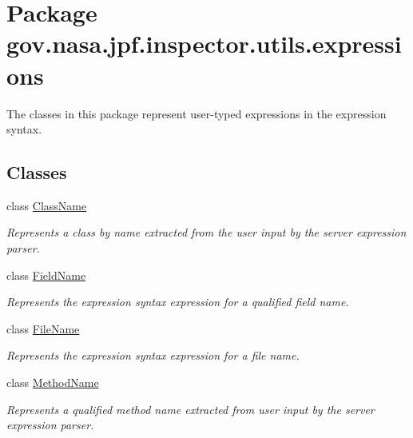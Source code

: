 \hypertarget{namespacegov_1_1nasa_1_1jpf_1_1inspector_1_1utils_1_1expressions}{}\section{Package gov.\+nasa.\+jpf.\+inspector.\+utils.\+expressions}
\label{namespacegov_1_1nasa_1_1jpf_1_1inspector_1_1utils_1_1expressions}


The classes in this package represent user-\/typed expressions in the expression syntax.  


\subsection*{Classes}
\begin{DoxyCompactItemize}
\item 
class \hyperlink{classgov_1_1nasa_1_1jpf_1_1inspector_1_1utils_1_1expressions_1_1_class_name}{Class\+Name}
\begin{DoxyCompactList}\small\item\em Represents a class by name extracted from the user input by the server expression parser. \end{DoxyCompactList}\item 
class \hyperlink{classgov_1_1nasa_1_1jpf_1_1inspector_1_1utils_1_1expressions_1_1_field_name}{Field\+Name}
\begin{DoxyCompactList}\small\item\em Represents the expression syntax expression for a qualified field name. \end{DoxyCompactList}\item 
class \hyperlink{classgov_1_1nasa_1_1jpf_1_1inspector_1_1utils_1_1expressions_1_1_file_name}{File\+Name}
\begin{DoxyCompactList}\small\item\em Represents the expression syntax expression for a file name. \end{DoxyCompactList}\item 
class \hyperlink{classgov_1_1nasa_1_1jpf_1_1inspector_1_1utils_1_1expressions_1_1_method_name}{Method\+Name}
\begin{DoxyCompactList}\small\item\em Represents a qualified method name extracted from user input by the server expression parser. \end{DoxyCompactList}\end{DoxyCompactItemize}


